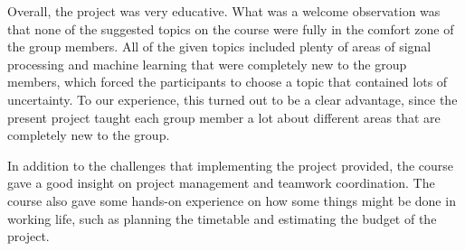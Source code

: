 Overall, the project was very educative. What was a welcome observation was that none of the suggested topics on the course were fully in the comfort zone of the group members. All of the given topics included plenty of areas of signal processing and machine learning that were completely new to the group members, which forced the participants to choose a topic that contained lots of uncertainty. To our experience, this turned out to be a clear advantage, since the present project taught each group member a lot about different areas that are completely new to the group.

In addition to the challenges that implementing the project provided, the course gave a good insight on project management and teamwork coordination. The course also gave some hands-on experience on how some things might be done in working life, such as planning the timetable and estimating the budget of the project.



